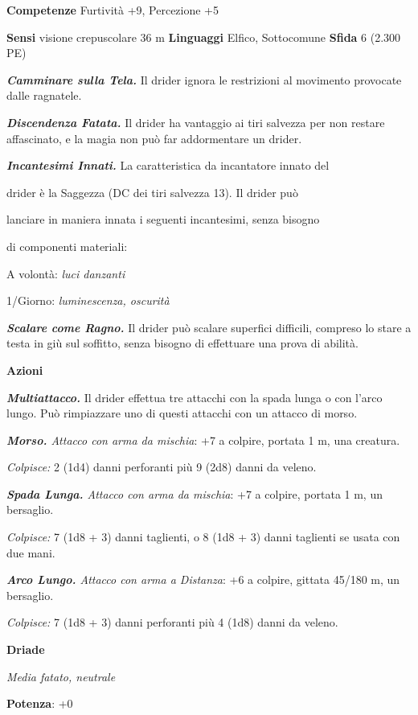 \begin{multicols}{2}
\textbf{Competenze} Furtività +9, Percezione +5

\textbf{Sensi} visione crepuscolare 36 m
\textbf{Linguaggi} Elfico, Sottocomune \textbf{Sfida} 6 (2.300 PE)\smallskip

\emph{\textbf{Camminare sulla Tela.}} Il drider ignora le restrizioni al
movimento provocate dalle ragnatele.

\emph{\textbf{Discendenza Fatata.}} Il drider ha vantaggio ai tiri
salvezza per non restare affascinato, e la magia non può far
addormentare un drider.

\emph{\textbf{Incantesimi Innati.}} La caratteristica da incantatore
innato del

drider è la Saggezza (DC dei tiri salvezza 13). Il drider può

lanciare in maniera innata i seguenti incantesimi, senza bisogno

di componenti materiali:

A volontà: \emph{luci danzanti}

1/Giorno: \emph{luminescenza, oscurità}

\emph{\textbf{Scalare come Ragno.}} Il drider può scalare superfici
difficili, compreso lo stare a testa in giù sul soffitto, senza bisogno
di effettuare una prova di abilità.

\smallskip\textbf{Azioni}

\emph{\textbf{Multiattacco.}} Il drider effettua tre attacchi con la
spada lunga o con l'arco lungo. Può rimpiazzare uno di questi attacchi
con un attacco di morso.

\emph{\textbf{Morso.} Attacco con arma da mischia}: +7 a colpire,
portata 1 m, una creatura.

\emph{Colpisce:} 2 (1d4) danni perforanti più 9 (2d8) danni da veleno.

\emph{\textbf{Spada Lunga.} Attacco con arma da mischia}: +7 a colpire,
portata 1 m, un bersaglio.

\emph{Colpisce:} 7 (1d8 + 3) danni taglienti, o 8 (1d8 + 3) danni
taglienti se usata con due mani.

\emph{\textbf{Arco Lungo.} Attacco con arma a Distanza}: +6 a colpire,
gittata 45/180 m, un bersaglio.

\emph{Colpisce:} 7 (1d8 + 3) danni perforanti più 4 (1d8) danni da
veleno.

\textbf{Driade}

\emph{Media fatato, neutrale}

\textbf{Potenza}: +0


\end{multicols}
